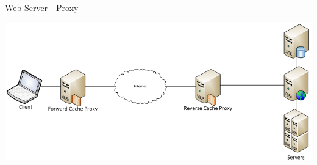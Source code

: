 \begin{frame}{Web Server - Proxy}
  \begin{center}
    \includegraphics[width=\textwidth,keepaspectratio]{sources/images/proxy_cache_topology.png}
  \end{center}
\end{frame}